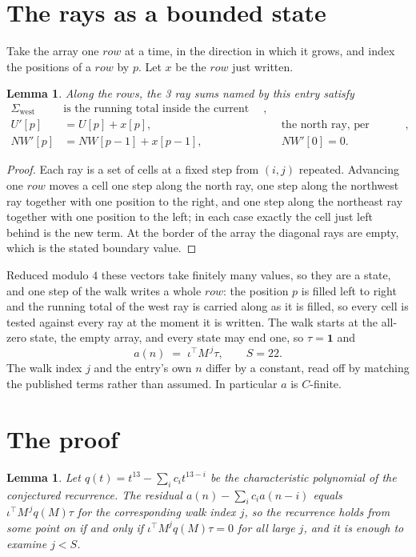 \documentclass[11pt,a4paper]{article}
\theoremstyle{plain}
\newtheorem{lemma}[theorem]{Lemma}
\theoremstyle{definition}
\begin{document}
\section{The rays as a bounded state}

Take the array one $row$ at a time, in the direction in which it grows, and index the
positions of a $row $ by $p$. Let $x$ be the $row$ just written.

\begin{lemma}\label{lem:rays}
Along the $row$s, the 3 ray sums named by this entry satisfy
\[
\begin{aligned}
\Sigma_{\mathrm{west}}\ &\text{is the running total inside the current row},\\
U'[p]&=U[p]+x[p], &&\text{the north ray, per position},\\
NW'[p]&=NW[p-1]+x[p-1], && NW'[0]=0 .
\end{aligned}
\]
\end{lemma}

\begin{proof}
Each ray is a set of cells at a fixed step from $(i,j)$ repeated. Advancing one $row$
moves a cell one step along the north ray, one step along the northwest ray together with one
position to the right, and one step along the northeast ray together with one position to the
left; in each case exactly the cell just left behind is the new term. At the border of the
array the diagonal rays are empty, which is the stated boundary value.
\end{proof}

Reduced modulo $4$ these vectors take finitely many values, so they are a state, and one step
of the walk writes a whole $row$: the position $p$ is filled left to right and the
running total of the west ray is carried along as it is filled, so every cell is tested
against every ray at the moment it is written. The walk starts at the all-zero state, the empty
array, and every state may end one, so $\tau=\mathbf{1}$ and
\[
a(n)\;=\;\iota^{\!\top}M^{\,j}\tau ,\qquad S=22.
\]
The walk index $j$ and the entry's own $n$ differ by a constant, read off by matching the
published terms rather than assumed. In particular $a$ is $C$-finite.

\section{The proof}

\begin{lemma}\label{lem:crit}
Let $q(t)=t^{13}-\sum_i c_it^{13-i}$ be the characteristic polynomial of the
conjectured recurrence. The residual $a(n)-\sum_ic_ia(n-i)$ equals
$\iota^{\!\top}M^{\,j}q(M)\tau$ for the corresponding walk index $j$, so the recurrence
holds from some point on if and only if $\iota^{\!\top}M^{j}q(M)\tau=0$ for all large $j$,
and it is enough to examine $j<S$.
\end{lemma}
\end{document}
